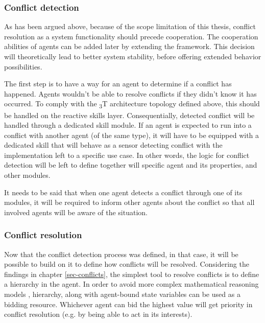 \documentclass[main.tex]{subfiles}
\begin{document}

\subsubsection{Conflict detection}

As has been argued above, because of the scope limitation of this thesis, 
conflict resolution as a system functionality should precede cooperation. The cooperation 
abilities of agents can be added later by extending the framework.
This decision will theoretically lead to better system stability, before offering extended
behavior possibilities. 

The first step is to have a way for an agent to determine if a conflict has happened. Agents wouldn't be 
able to resolve conflicts if they didn't know it has occurred. To comply with the \textsubscript{3}T
architecture topology defined above, this should be handled on the reactive skills layer. 
Consequentially, detected conflict will be handled through a dedicated skill module. If an
agent is expected to run into a conflict with another agent (of the same 
 type), it will have to be equipped with a dedicated skill that will behave as a sensor detecting conflict 
with the implementation left to a specific use case. In other words, the logic for conflict detection will be 
left to define together will specific agent and its properties, and other modules.

It needs to be said that when one agent detects a conflict through one of its modules, it will 
be required to inform other agents about the conflict so that all involved agents will be
aware of the situation. 

\subsubsection{Conflict resolution}

Now that the conflict detection process was defined, in that case, it will be possible to build
on it to define how conflicts will be resolved. Considering the findings in chapter
\ref{sec-conflicts}, the simplest tool to resolve conflicts is to define a hierarchy in the
agent. In order to avoid more complex mathematical reasoning models \cite{Binder2022},
hierarchy, along with agent-bound state variables can be used as a bidding resource. Whichever
agent can bid the highest value will get priority in conflict resolution (e.g. by being
able to act in its interests).
\end{document}
